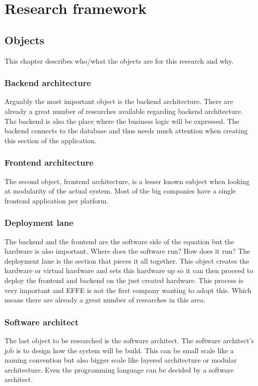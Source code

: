 \section{Research framework}

\subsection{Objects}
This chapter describes who/what the objects are for this research and why.

\subsubsection{Backend architecture}
Arguably the most important object is the backend architecture. There are already a great number of researches available regarding backend architecture. The backend is also the place where the business logic will be expressed. The backend connects to the database and thus needs much attention when creating this section of the application.

\subsubsection{Frontend architecture}
The second object, frontend architecture, is a lesser known subject when looking at modularity of the actual system. Most of the big companies have a single frontend application per platform.

\subsubsection{Deployment lane}
\label{sec:DeploymentLane}
The backend and the frontend are the software side of the equation but the hardware is also important. Where does the software run? How does it run? The deployment lane is the section that pieces it all together. This object creates the hardware or virtual hardware and sets this hardware up so it can then proceed to deploy the frontend and backend on the just created hardware. This process is very important and EFFE is not the first company wanting to adopt this. Which means there are already a great number of researches in this area.

\subsubsection{Software architect}
\label{sec:SoftwareArchitect}
The last object to be researched is the software architect. The software architect's job is to design how the system will be build. This can be small scale like a naming convention but also bigger scale like layered architecture or modular architecture. Even the programming language can be decided by a software architect.

